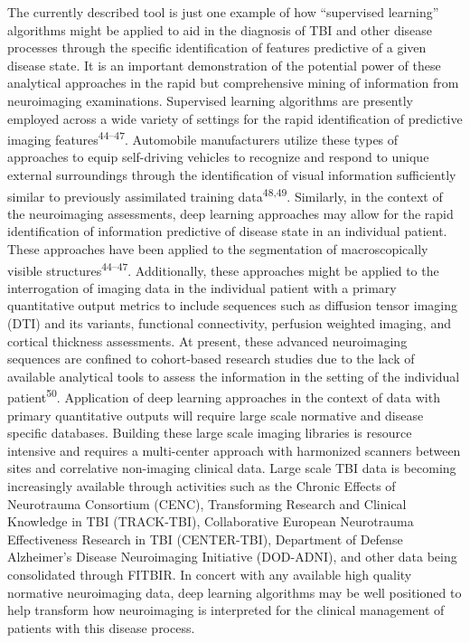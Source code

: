 \documentclass[11pt,]{article}
\begin{document}
The currently described tool is just one example of how ``supervised
learning'' algorithms might be applied to aid in the diagnosis of TBI
and other disease processes through the specific identification of
features predictive of a given disease state. It is an important
demonstration of the potential power of these analytical approaches in
the rapid but comprehensive mining of information from neuroimaging
examinations. Supervised learning algorithms are presently employed
across a wide variety of settings for the rapid identification of
predictive imaging features\textsuperscript{44--47}. Automobile
manufacturers utilize these types of approaches to equip self-driving
vehicles to recognize and respond to unique external surroundings
through the identification of visual information sufficiently similar to
previously assimilated training data\textsuperscript{48,49}. Similarly,
in the context of the neuroimaging assessments, deep learning approaches
may allow for the rapid identification of information predictive of
disease state in an individual patient. These approaches have been
applied to the segmentation of macroscopically visible
structures\textsuperscript{44--47}. Additionally, these approaches might
be applied to the interrogation of imaging data in the individual
patient with a primary quantitative output metrics to include sequences
such as diffusion tensor imaging (DTI) and its variants, functional
connectivity, perfusion weighted imaging, and cortical thickness
assessments. At present, these advanced neuroimaging sequences are
confined to cohort-based research studies due to the lack of available
analytical tools to assess the information in the setting of the
individual patient\textsuperscript{50}. Application of deep learning
approaches in the context of data with primary quantitative outputs will
require large scale normative and disease specific databases. Building
these large scale imaging libraries is resource intensive and requires a
multi-center approach with harmonized scanners between sites and
correlative non-imaging clinical data. Large scale TBI data is becoming
increasingly available through activities such as the Chronic Effects of
Neurotrauma Consortium (CENC), Transforming Research and Clinical
Knowledge in TBI (TRACK-TBI), Collaborative European Neurotrauma
Effectiveness Research in TBI (CENTER-TBI), Department of Defense
Alzheimer's Disease Neuroimaging Initiative (DOD-ADNI), and other data
being consolidated through FITBIR. In concert with any available high
quality normative neuroimaging data, deep learning algorithms may be
well positioned to help transform how neuroimaging is interpreted for
the clinical management of patients with this disease process.
\end{document}
